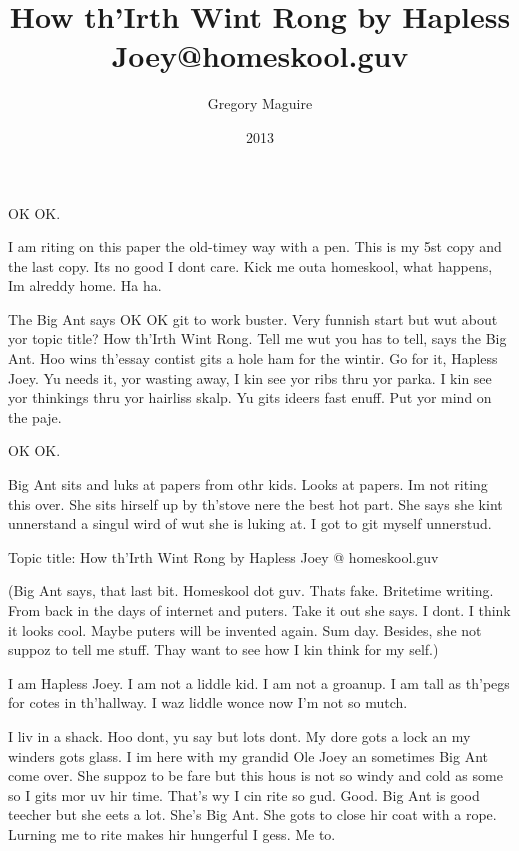\documentclass[10pt,a4paper]{article}
\begin{document}
\title{How th’Irth Wint Rong by Hapless Joey@homeskool.guv}
\date{2013}
\author{Gregory Maguire}
\maketitle
    
\pagestyle{empty}
\thispagestyle{empty}
\linenumbers
OK OK.

I am riting on this paper the old-timey way with a pen.
This is my 5st copy and the last copy. Its no good I dont care.
Kick me outa homeskool, what happens, Im alreddy home. Ha ha.

The Big Ant says OK OK git to work buster. Very funnish start but wut about yor topic title? How th’Irth Wint Rong. Tell me wut you has to tell, says the Big Ant. Hoo wins th’essay contist gits a hole ham for the wintir. Go for it, Hapless Joey. Yu needs it, yor wasting away, I kin see yor ribs thru yor parka. I kin see yor thinkings thru yor hairliss skalp. Yu gits ideers fast enuff. Put yor mind on the paje.

OK OK.

Big Ant sits and luks at papers from othr kids. Looks at papers.
Im not riting this over. She sits hirself up by th’stove nere the best hot part. She says she kint unnerstand a singul wird of wut she is luking at. I got to git myself unnerstud.

Topic title: How th’Irth Wint Rong by Hapless Joey @ homeskool.guv

(Big Ant says, that last bit. Homeskool dot guv. Thats fake. Britetime writing. From back in the days of internet and puters. Take it out she says. I dont. I think it looks cool. Maybe puters will be invented again. Sum day. Besides, she not suppoz to tell me stuff. Thay want to see how I kin think for my self.)

I am Hapless Joey. I am not a liddle kid. I am not a groanup. I am tall as th’pegs for cotes in th’hallway. I waz liddle wonce now I’m not so mutch.

I liv in a shack. Hoo dont, yu say but lots dont. My dore gots a lock an my winders gots glass. I im here with my grandid Ole Joey an sometimes Big Ant come over. She suppoz to be fare but this hous is not so windy and cold as some so I gits mor uv hir time. That’s wy I cin rite so gud. Good. Big Ant is good teecher but she eets a lot. She’s Big Ant. She gots to close hir coat with a rope. Lurning me to rite makes hir hungerful I gess. Me to.
\end{document}
